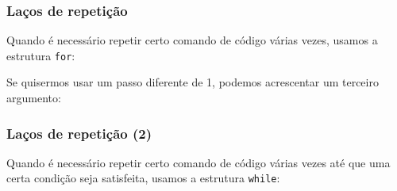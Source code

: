 \documentclass{beamer}
\newcommand{\kw}[1]{\alert{\texttt{#1}}}
\begin{document}
\begin{frame}[fragile]
  \frametitle{Laços de repetição}
  Quando é necessário repetir certo comando de código várias vezes, usamos a estrutura \kw{for}:
  \begin{center}
  \end{center}
  Se quisermos usar um passo diferente de 1, podemos acrescentar um terceiro argumento:
  \begin{center}
  \end{center}
\end{frame}
\begin{frame}[fragile]
  \frametitle{Laços de repetição (2)}
  Quando é necessário repetir certo comando de código várias vezes \alert{até que} uma certa condição seja satisfeita, usamos a estrutura \kw{while}:
  \begin{center}
  \end{center}
\end{frame}
\end{document}

